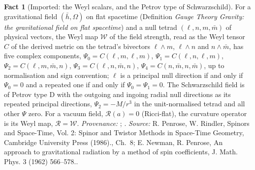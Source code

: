 \documentclass[11pt]{article}
\theoremstyle{definition}
\newtheorem{fact}[theorem]{Fact}
\theoremstyle{plain}
\providecommand{\hb}{}\renewcommand{\hb}{\bar{h}}
\providecommand{\mb}{}\renewcommand{\mb}{\bar m}
\begin{document}
\begin{fact}[Imported: the Weyl scalars, and the Petrov type of Schwarzschild]\label{c:pairing.imported-weyl-scalars-petrov-type-schwarzschild}
For a gravitational field $(\hb, \Omega)$ on flat spacetime (Definition \emph{Gauge Theory Gravity: the gravitational field on flat spacetime}) and a null tetrad $(\ell, n, m, \mb)$ of physical vectors, the Weyl map $\mathcal{W}$ of the field strength, read as the Weyl tensor $C$ of the derived metric on the tetrad's bivectors $\ell \wedge m$, $\ell \wedge n$ and $n \wedge \mb$, has five complex components, $\Psi_{0} = C(\ell, m, \ell, m)$, $\Psi_{1} = C(\ell, n, \ell, m)$, $\Psi_{2} = C(\ell, m, \mb, n)$, $\Psi_{3} = C(\ell, n, \mb, n)$, $\Psi_{4} = C(n, \mb, n, \mb)$, up to normalisation and sign convention; $\ell$ is a principal null direction if and only if $\Psi_{0} = 0$ and a repeated one if and only if $\Psi_{0} = \Psi_{1} = 0$. The Schwarzschild field is of Petrov type D with the outgoing and ingoing radial null directions as its repeated principal directions, $\Psi_{2} = -M/r^{3}$ in the unit-normalised tetrad and all other $\Psi$ zero. For a vacuum field, $\mathcal{R}(a) = 0$ (Ricci-flat), the curvature operator is its Weyl map, $\mathcal{R} = \mathcal{W}$. \emph{Provenance:} \cite[Ch.~8]{PenroseRindler2}; \cite{NewmanPenrose1962}.
\emph{Source:} R. Penrose, W. Rindler, Spinors and Space-Time, Vol. 2: Spinor and Twistor Methods in Space-Time Geometry, Cambridge University Press (1986)., Ch.~8; E. Newman, R. Penrose, An approach to gravitational radiation by a method of spin coefficients, J. Math. Phys. 3 (1962) 566--578..
\end{fact}
\end{document}
